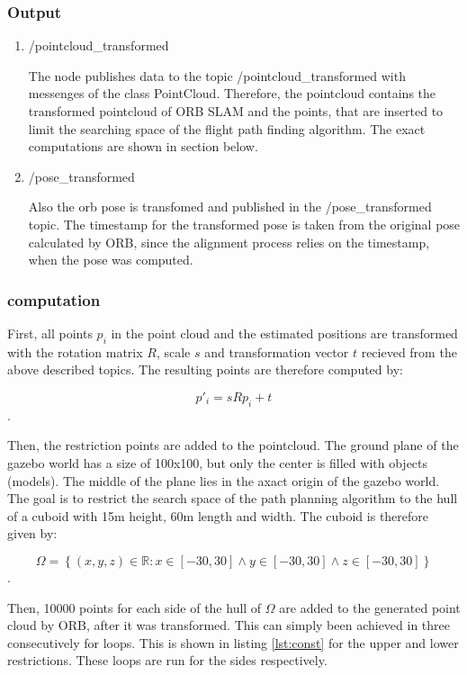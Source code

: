	\subsubsection{Output}
	
	\begin{enumerate}
	\item{/pointcloud\_transformed}
	
	The node publishes data to the topic /pointcloud\_transformed with messenges of the class PointCloud. Therefore, the pointcloud contains the transformed 
	pointcloud of ORB SLAM and the points, that are inserted to limit the searching space of the flight path finding algorithm. 
	The exact computations are shown 
	in section below. 
	
	\item{/pose\_transformed}
	
	Also the orb pose is transfomed and published in the /pose\_transformed topic. The timestamp for the transformed pose is taken from the original pose 
	calculated by ORB, since the alignment process relies on the timestamp, when the pose was computed. 
	
	\end{enumerate}
	
	\subsubsection{computation}
	
	First, all points $p_i$ in the point cloud and the estimated positions are transformed with the rotation matrix $R$, scale $s$ and transformation vector $t$ recieved 
	from the above described topics. The resulting points are therefore computed by: 
	
	$$p'_i = sRp_i + t$$.
	
	Then, the restriction points are added to the pointcloud.
	The ground plane of the gazebo world has a size of 100x100, but only the center is filled with objects (models). The middle of the plane 
	lies in the axact origin of the gazebo world. The goal is to restrict the search space of the path planning algorithm to the hull of a cuboid with 15m
	height, 60m length and width. The cuboid is therefore given by: 
	
	$$\Omega = \left\{(x, y, z) \in \mathbb{R} : x \in \left[-30, 30\right] \land y \in \left[-30, 30\right] \land z \in \left[-30, 30\right] \right\}$$.
	
	Then, 10000 points for each side of the hull of $\Omega$ are added to the generated point cloud by ORB, after it was transformed. This can simply been achieved 
	in three consecutively for loops. This is shown in listing \ref{lst:const} for the upper and lower restrictions. These loops are run for the sides respectively. 
	
